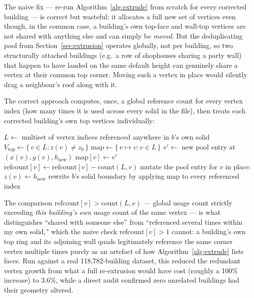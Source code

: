 \documentclass[11pt]{article}
\begin{document}
The naive fix --- re-run Algorithm~\ref{alg:extrude} from scratch for every corrected building
--- is correct but wasteful: it allocates a full new set of vertices even though, in the
common case, a building's own top-face and wall-top vertices are not shared with anything
else and can simply be \emph{moved}. But the deduplicating pool from
Section~\ref{sec:extrusion} operates globally, not per building, so two structurally attached
buildings (e.g.\ a row of shophouses sharing a party wall) that happen to have landed on the
same default height can genuinely share a vertex at their common top corner. Moving such a
vertex in place would silently drag a neighbour's roof along with it.

The correct approach computes, once, a global reference count for every vertex index (how many
times it is used across every solid in the file), then treats each corrected building's own
top vertices individually:

\begin{algorithm}[H]
\caption{Relocate a building's roof to a new height, without corrupting shared geometry}
\label{alg:reheight}
\begin{algorithmic}[1]
  \State $L \gets$ multiset of vertex indices referenced anywhere in $b$'s own solid
  \State $V_{\text{top}} \gets \{\, v \in L : z(v) \neq z_0 \,\}$ 
  \State $\mathrm{map} \gets \{\, v \mapsto v : v \in L \,\}$ 
     
      \State $v' \gets$ new pool entry at $(x(v), y(v), h_{\text{new}})$
      \State $\mathrm{map}[v] \gets v'$
      \State $\mathrm{refcount}[v] \gets \mathrm{refcount}[v] - \mathrm{count}(L, v)$
    \Else {}
      \State mutate the pool entry for $v$ in place: $z(v) \gets h_{\text{new}}$
    \EndIf
  \EndFor
  \State rewrite $b$'s solid boundary by applying $\mathrm{map}$ to every referenced index
\EndFunction
\end{algorithmic}
\end{algorithm}

The comparison $\mathrm{refcount}[v] > \mathrm{count}(L, v)$ --- global usage count strictly
exceeding \emph{this building's own} usage count of the same vertex --- is what distinguishes
``shared with someone else'' from ``referenced several times within my own solid,'' which the
naive check $\mathrm{refcount}[v] > 1$ cannot: a building's own top ring and its adjoining wall
quads legitimately reference the same corner vertex multiple times purely as an artefact of
how Algorithm~\ref{alg:extrude} lists faces. Run against a real 118{,}782-building dataset,
this reduced the redundant vertex growth from what a full re-extrusion would have cost
(roughly a 100\% increase) to 3.6\%, while a direct audit confirmed zero unrelated buildings
had their geometry altered.
\end{document}
